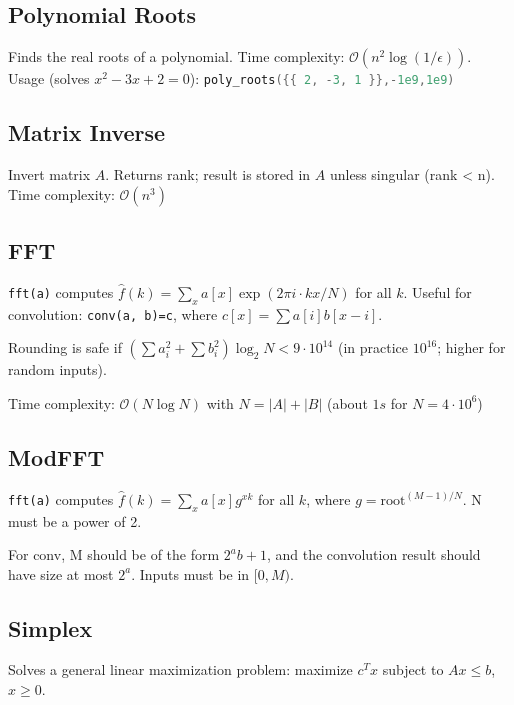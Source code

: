 \documentclass{article}
\begin{document}
\begin{multicols}{2}
\subsection*{Polynomial Roots}
Finds the real roots of a polynomial. Time complexity: $\mathcal{O}(n^2 \log(1/\epsilon))$.
Usage (solves $x^2-3x+2 = 0$): \lstinline[language=cpp]|poly_roots({{ 2, -3, 1 }},-1e9,1e9)|

\columnbreak
\subsection*{Matrix Inverse}
Invert matrix $A$. Returns rank; result is stored in $A$ unless singular (rank < n). Time complexity: $\mathcal{O}(n^3)$

\end{multicols}

\vspace*{-0.3cm}

\subsection*{FFT}
\lstinline{fft(a)} computes $\hat f(k) = \sum_x a[x] \exp(2\pi i \cdot k x / N)$ for all $k$.
Useful for convolution: \lstinline{conv(a, b)=c}, where $c[x] = \sum a[i]b[x-i]$.

Rounding is safe if $(\sum a_i^2 + \sum b_i^2)\log_2{N} < 9\cdot10^{14}$
(in practice $10^{16}$; higher for random inputs).

Time complexity: $\mathcal{O}(N \log N)$ with $N = |A|+|B|$ (about $1s$ for $N=4 \cdot 10^6$)


\newpage

\subsection*{ModFFT}
\lstinline{fft(a)} computes $\hat f(k) = \sum_x a[x] g^{xk}$ for all $k$, where $g=\text{root}^{(M-1)/N}$. N must be a power of 2.

For conv, M should be of the form $2^a b+1$, and the convolution result should have size at most $2^a$. Inputs must be in $[0,M)$.



\subsection*{Simplex}
Solves a general linear maximization problem: maximize $c^T x$ subject to $Ax \le b$, $x \ge 0$.
\end{document}
